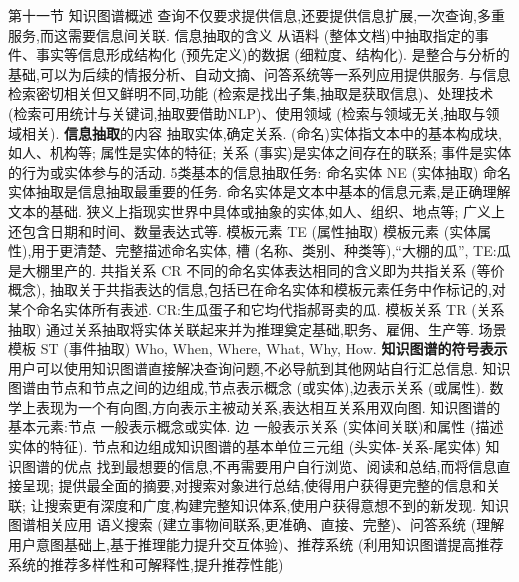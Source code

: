 \documentclass[10pt, utf8]{ctexart}
\begin{document}
\begin{multicols}{4}
    {\color{orange_}第十一节 知识图谱概述}
    查询不仅要求提供信息,还要提供信息扩展,一次查询,多重服务,而这需要信息间关联.
    {\color{blue}信息抽取的含义}
    从语料 (整体文档)中抽取指定的事件、事实等信息形成结构化 (预先定义)的数据 (细粒度、结构化).
    是整合与分析的基础,可以为后续的情报分析、自动文摘、问答系统等一系列应用提供服务.
    与信息检索密切相关但又鲜明不同,功能 (检索是找出子集,抽取是获取信息)、处理技术 (检索可用统计与关键词,抽取要借助NLP)、使用领域 (检索与领域无关,抽取与领域相关).
        {\color{purple_}\textbf{信息抽取}\color{blue}的内容}
    抽取实体,确定关系.
    (命名)实体指文本中的基本构成块,如人、机构等;
    属性是实体的特征;
    关系 (事实)是实体之间存在的联系;
    事件是实体的行为或实体参与的活动.
    {\color{blue}5类基本的信息抽取任务:}
    {\color{blue}命名实体 NE (实体抽取)}
    命名实体抽取是信息抽取最重要的任务.
    命名实体是文本中基本的信息元素,是正确理解文本的基础.
    狭义上指现实世界中具体或抽象的实体,如人、组织、地点等;
    广义上还包含日期和时间、数量表达式等.
    {\color{blue}模板元素 TE (属性抽取)}
    模板元素 (实体属性),用于更清楚、完整描述命名实体,
    槽 (名称、类别、种类等),“大棚的瓜”, TE:瓜是大棚里产的.
    {\color{blue}共指关系 CR}
    不同的命名实体表达相同的含义即为共指关系 (等价概念),
    抽取关于共指表达的信息,包括已在命名实体和模板元素任务中作标记的,对某个命名实体所有表述.
    CR:生瓜蛋子和它均代指郝哥卖的瓜.
    {\color{blue}模板关系 TR (关系抽取)}
    通过关系抽取将实体关联起来并为推理奠定基础,职务、雇佣、生产等.
    {\color{blue}场景模板 ST (事件抽取)}
    Who, When, Where, What, Why, How.
        {\color{purple_}\textbf{知识图谱的符号表示}}
    用户可以使用知识图谱直接解决查询问题,不必导航到其他网站自行汇总信息.
    知识图谱由节点和节点之间的边组成,节点表示概念 (或实体),边表示关系 (或属性).
    数学上表现为一个有向图,方向表示主被动关系,表达相互关系用双向图.
    {\color{blue}知识图谱的基本元素:节点}
    一般表示概念或实体.
    {\color{blue}边}
    一般表示关系 (实体间关联)和属性 (描述实体的特征).
    节点和边组成知识图谱的基本单位三元组 (头实体-关系-尾实体)
    {\color{blue}知识图谱的优点}
    找到最想要的信息,不再需要用户自行浏览、阅读和总结,而将信息直接呈现;
    提供最全面的摘要,对搜索对象进行总结,使得用户获得更完整的信息和关联;
    让搜索更有深度和广度,构建完整知识体系,使用户获得意想不到的新发现.
    {\color{blue}知识图谱相关应用}
    语义搜索 (建立事物间联系,更准确、直接、完整)、问答系统 (理解用户意图基础上,基于推理能力提升交互体验)、推荐系统 (利用知识图谱提高推荐系统的推荐多样性和可解释性,提升推荐性能)

\end{multicols}
\end{document}

